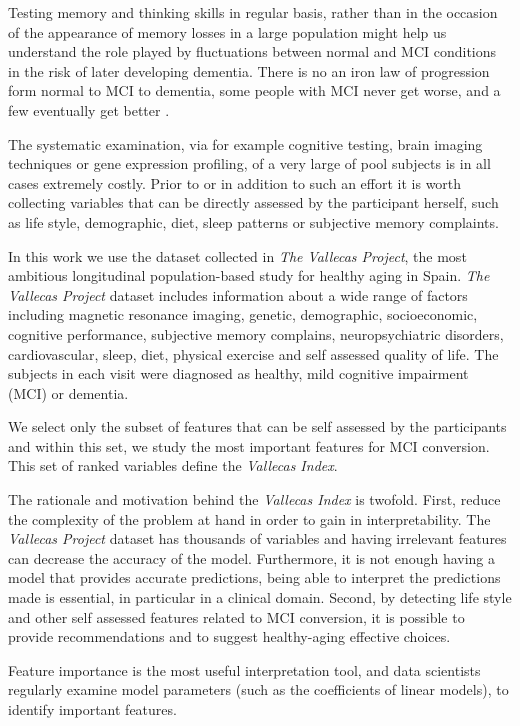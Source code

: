 \documentclass[preprint,12pt]{elsarticle}
\begin{document}
Testing memory and thinking skills in regular basis, rather than in the occasion of the appearance of memory losses in a large population might help us understand the role played by fluctuations between normal and MCI conditions in the risk of later developing dementia. There is no an iron law of progression form normal to MCI to dementia, some people with MCI never get worse, and a few eventually get better \cite{MA}. 

The systematic examination, via for example cognitive testing, brain imaging techniques or gene expression profiling, of a very large of pool subjects is in all cases extremely costly. Prior to or in addition to such an effort it is worth collecting variables that can be directly assessed by the participant herself, such as life style, demographic, diet, sleep patterns or subjective memory complaints. 

In this work we use the dataset collected in \emph{The Vallecas Project}, the most ambitious longitudinal population-based study for healthy aging in Spain. 
\emph{The Vallecas Project} dataset includes information about a wide range of factors including magnetic resonance imaging, genetic, demographic, socioeconomic, cognitive performance, subjective memory complains, neuropsychiatric disorders, cardiovascular, sleep, diet, physical exercise and self assessed quality of life. The subjects in each visit were diagnosed as healthy, mild cognitive impairment (MCI) or dementia.

We select only the subset of features that can be self assessed by the participants and within this set, we study the most important features for MCI conversion. This set of ranked variables define the \emph{Vallecas Index}.

The rationale and motivation behind the \emph{Vallecas Index} is twofold. First, reduce the complexity of the problem at hand in order to gain in interpretability. The \emph{Vallecas Project} dataset has thousands of variables and having irrelevant features can decrease the accuracy of the model. Furthermore, it is not enough having a model that provides accurate predictions, being able to interpret the predictions made is essential, in particular in a clinical domain.
Second, by detecting life style and other self assessed features related to MCI conversion, it is possible to provide recommendations and to suggest healthy-aging effective choices.

Feature importance is the most useful interpretation tool, and data scientists regularly examine model parameters (such as the coefficients of linear models), to identify important features. 
\end{document}
